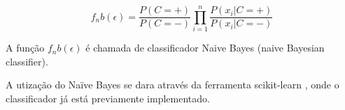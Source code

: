 \begin{equation}
\label{eq:bayes_classic}
 {f_nb}(\epsilon) =  \frac{P(C = +)}{P(C = -)} \prod_{i=1}^{n} \frac{P({x_i} | C = +)}{P({x_i} | C = -)}
\end{equation}

A função ${f_nb}(\epsilon)$ é chamada de classificador Naive Bayes (naive Bayesian classifier).

A utização do Naïve Bayes se dara através da ferramenta scikit-learn , onde o classificador já está previamente implementado.

